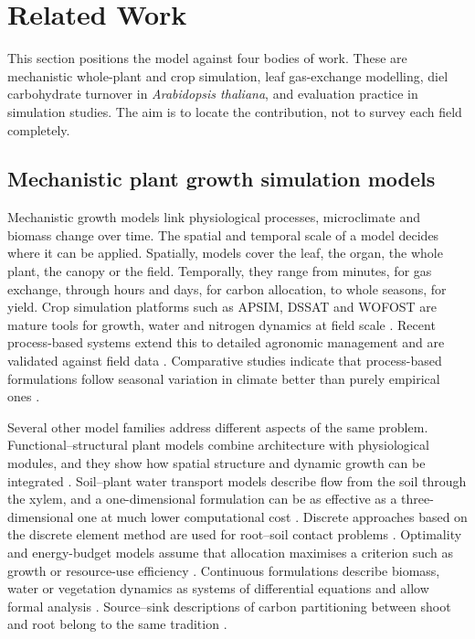 \section{Related Work}
\label{sec:related}

This section positions the model against four bodies of work. These are
mechanistic whole-plant and crop simulation, leaf gas-exchange modelling, diel
carbohydrate turnover in \textit{Arabidopsis thaliana}, and evaluation practice
in simulation studies. The aim is to locate the contribution, not to survey
each field completely.

\subsection{Mechanistic plant growth simulation models}

Mechanistic growth models link physiological processes, microclimate and
biomass change over time. The spatial and temporal scale of a model decides
where it can be applied. Spatially, models cover the leaf, the organ, the whole
plant, the canopy or the field. Temporally, they range from minutes, for
gas exchange, through hours and days, for carbon allocation, to whole seasons,
for yield. Crop simulation platforms such as APSIM, DSSAT and WOFOST are mature
tools for growth, water and nitrogen dynamics at field scale
\cite{Holzworth2014,Jones2003,deWit2019}. Recent process-based systems extend
this to detailed agronomic management and are validated against field data
\cite{BuckleyPaules2025}. Comparative studies indicate that process-based
formulations follow seasonal variation in climate better than purely empirical
ones \cite{Mamassi2024}.

Several other model families address different aspects of the same problem.
Functional--structural plant models combine architecture with physiological
modules, and they show how spatial structure and dynamic growth can be
integrated \cite{Louarn2020,Sievnen2014,DeReffye2020}. Soil--plant water
transport models describe flow from the soil through the xylem, and a
one-dimensional formulation can be as effective as a three-dimensional one at
much lower computational cost \cite{Janott2011}. Discrete approaches based on
the discrete element method are used for root--soil contact problems
\cite{Tian2024}. Optimality and energy-budget models assume that allocation
maximises a criterion such as growth or resource-use efficiency
\cite{Russo2022}. Continuous formulations describe biomass, water or vegetation
dynamics as systems of differential equations and allow formal analysis
\cite{Meron2019,ThornleyJohnson1990}. Source--sink descriptions of carbon
partitioning between shoot and root belong to the same tradition
\cite{Marcelis1996,Feller2015,Thornley1972}.

